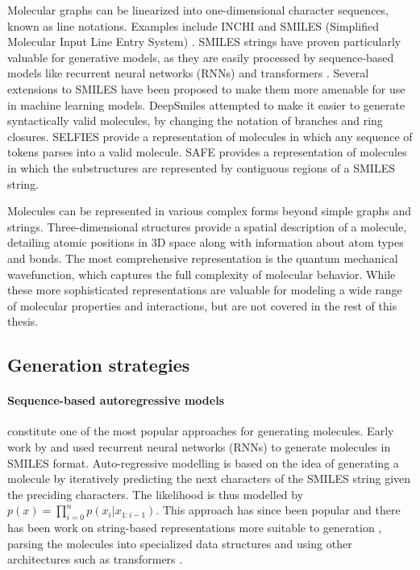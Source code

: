 Molecular graphs can be linearized into one-dimensional character sequences, known as line
notations. Examples include INCHI \citep{hellerInChIIUPACInternational2015} and SMILES (Simplified
Molecular Input Line Entry System) \citep{weiningerSMILESChemicalLanguage1988}. SMILES strings have
proven particularly valuable for generative models, as they are easily processed by sequence-based
models like recurrent neural networks (RNNs) and transformers \citep{vaswaniAttentionAllYou2017}.
Several extensions to SMILES have been proposed to make them more amenable for use in
machine learning models. DeepSmiles \citep{oboyleDeepSMILESAdaptationSMILES2018} attempted
to make it easier to generate syntactically valid molecules, by changing the notation of
branches and ring closures. SELFIES \citep{krennSELFIESFutureMolecular2022} provide a
representation of molecules in which any sequence of tokens parses into a valid molecule.
SAFE \citep{noutahiGottaBeSAFE2023} provides a representation of molecules in which the
substructures are represented by contiguous regions of a SMILES string.

Molecules can be represented in various complex forms beyond simple graphs and strings.
Three-dimensional structures provide a spatial description of a molecule, detailing atomic positions
in 3D space along with information about atom types and bonds. The most comprehensive representation
is the quantum mechanical wavefunction, which captures the full complexity of molecular behavior.
While these more sophisticated representations are valuable for modeling a wide range of molecular
properties and interactions, but are not covered in the rest of this thesis.

\subsection{Generation strategies}

\paragraph{Sequence-based autoregressive models} constitute one of the most popular approaches for
generating molecules. Early work by \citep{seglerGeneratingFocusedMolecule2018} and
\citep{gomez-bombarelliAutomaticChemicalDesign2018} used recurrent neural networks (RNNs) to
generate molecules in SMILES format. Auto-regressive modelling is based on the idea of generating a
molecule by iteratively predicting the next characters of the SMILES string given the preciding
characters. The likelihood is thus modelled by $p(x) = \prod_{i=0}^n p(x_i | x_{1:i-1})$. This
approach has since been popular and there has been work on string-based representations more
suitable to generation
\citep{oboyleDeepSMILESAdaptationSMILES2018,krennSelfReferencingEmbeddedStrings2020}, parsing the
molecules into specialized data structures
\citep{kusnerGrammarVariationalAutoencoder2017,jinJunctionTreeVariational2018} and using other
architectures such as transformers \citep{vaswaniAttentionAllYou2017,noutahiGottaBeSAFE2023,schwallerMolecularTransformerModel2019,bagalMolGPTMolecularGeneration2022,mazuzMoleculeGenerationUsing2023}.

